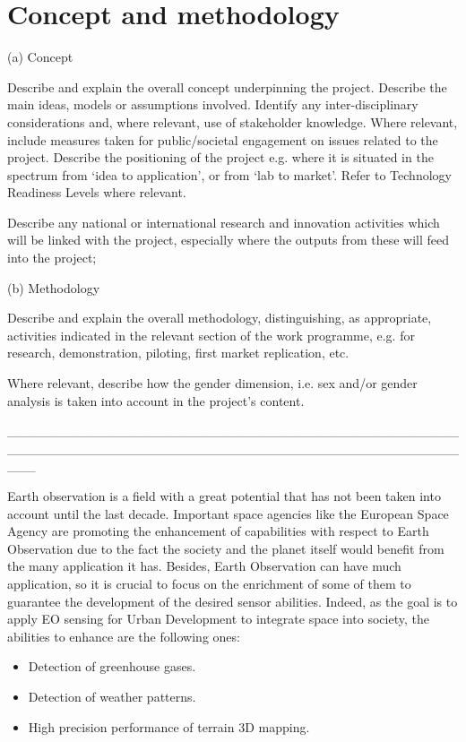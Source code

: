 \section{Concept and methodology}

(a) Concept

Describe and explain the overall concept underpinning the project. Describe the main
ideas, models or assumptions involved. Identify any inter-disciplinary considerations and, where relevant, use of stakeholder knowledge. Where relevant, include measures taken for public/societal engagement on issues related to the project. Describe the positioning of the project e.g. where it is situated in the spectrum from ‘idea to application’, or from ‘lab to market’. Refer to Technology Readiness Levels where relevant.

Describe any national or international research and innovation activities which will be linked with the project, especially where the outputs from these will feed into the project;

(b) Methodology

Describe and explain the overall methodology, distinguishing, as appropriate, activities indicated in the relevant section of the work programme, e.g. for research, demonstration, piloting, first market replication, etc.

Where relevant, describe how the gender dimension, i.e. sex and/or gender analysis is taken into account in the project’s content.

___________________________________________________________________________________________________

Earth observation is a field with a great potential that has not been taken into account until the last decade. Important space agencies like the European Space Agency are promoting the enhancement of capabilities with respect to Earth Observation due to the fact the society and the planet itself would benefit from the many application it has. Besides, Earth Observation can have much application, so it is crucial to focus on the enrichment of some of them to guarantee the development of the desired sensor abilities. Indeed, as the goal is to apply EO sensing for Urban Development to integrate space into
society, the abilities to enhance are the following ones:

\begin{itemize}
 \item  Detection of greenhouse gases.
 \item  Detection of weather patterns.
 \item  High precision performance of terrain 3D mapping.
\end{itemize}

